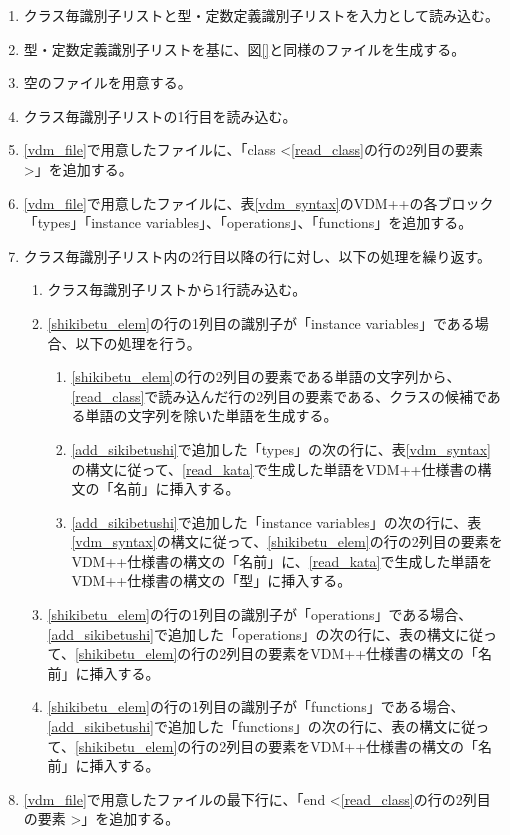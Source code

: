 \begin{enumerate}
    \item クラス毎識別子リストと型・定数定義識別子リストを入力として読み込む。
    \item 型・定数定義識別子リストを基に、図\ref{}と同様のファイルを生成する。
    \item 空のファイルを用意する。
    \label{vdm_file}
    \item クラス毎識別子リストの1行目を読み込む。
    \label{read_class}
    \item \ref{vdm_file}で用意したファイルに、「class \textless \ref{read_class}の行の2列目の要素 \textgreater」を追加する。
    \item \ref{vdm_file}で用意したファイルに、表\ref{vdm_syntax}のVDM++の各ブロック「types」「instance variables」、「operations」、「functions」を追加する。
    \label{add_sikibetushi}
    \item クラス毎識別子リスト内の2行目以降の行に対し、以下の処理を繰り返す。
        \begin{enumerate}
            \item クラス毎識別子リストから1行読み込む。
            \label{shikibetu_elem}
            \item \ref{shikibetu_elem}の行の1列目の識別子が「instance variables」である場合、以下の処理を行う。
                \begin{enumerate}
                    \item \ref{shikibetu_elem}の行の2列目の要素である単語の文字列から、\ref{read_class}で読み込んだ行の2列目の要素である、クラスの候補である単語の文字列を除いた単語を生成する。
                    \label{read_kata}
                    \item \ref{add_sikibetushi}で追加した「types」の次の行に、表{\ref{vdm_syntax}}の構文に従って、\ref{read_kata}で生成した単語をVDM++仕様書の構文の「名前」に挿入する。
                    \item \ref{add_sikibetushi}で追加した「instance variables」の次の行に、表\ref{vdm_syntax}の構文に従って、\ref{shikibetu_elem}の行の2列目の要素をVDM++仕様書の構文の「名前」に、\ref{read_kata}で生成した単語をVDM++仕様書の構文の「型」に挿入する。
                \end{enumerate}
            \item \ref{shikibetu_elem}の行の1列目の識別子が「operations」である場合、\ref{add_sikibetushi}で追加した「operations」の次の行に、表{}の構文に従って、\ref{shikibetu_elem}の行の2列目の要素をVDM++仕様書の構文の「名前」に挿入する。
            \item \ref{shikibetu_elem}の行の1列目の識別子が「functions」である場合、\ref{add_sikibetushi}で追加した「functions」の次の行に、表{}の構文に従って、\ref{shikibetu_elem}の行の2列目の要素をVDM++仕様書の構文の「名前」に挿入する。
        \end{enumerate}
    \item \ref{vdm_file}で用意したファイルの最下行に、「end \textless \ref{read_class}の行の2列目の要素 \textgreater」を追加する。
\end{enumerate}

